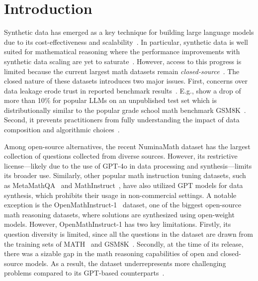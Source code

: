 

\section{Introduction}

Synthetic data has emerged as a key technique for building large language models due to its cost-effectiveness and scalability~\citep{dubey2024llama3herdmodels, nvidia2024nemotron4340btechnicalreport, deepseekai2024deepseekv2strongeconomicalefficient}. 
In particular, synthetic data is well suited for mathematical reasoning where the performance improvements with synthetic data scaling are yet to saturate~\citep{zeng2024skyworkmathdatascalinglaws, chan2024scalingsyntheticdatacreation, yang2024qwen25mathtechnicalreportmathematical}. 
However, access to this progress is limited because the current largest math datasets remain \emph{closed-source}~\citep{zeng2024skyworkmathdatascalinglaws, yang2024qwen25mathtechnicalreportmathematical}. 
The closed nature of these datasets introduces two major issues. First, concerns over data leakage erode trust in reported benchmark results~\citep{aiyappa-etal-2023-trust}. E.g., \citet{zhang2024carefulexaminationlargelanguage} show a drop of more than 10\% for popular LLMs on an unpublished test set which is distributionally similar to the popular grade school math benchmark GSM8K~\citep{cobbe2021gsm8k}. Second, it prevents practitioners from fully understanding the impact of data composition and algorithmic choices~\citep{azerbayev2024llemma, soldaini-etal-2024-dolma}. 



Among open-source alternatives, the recent NuminaMath dataset \citep{li2024numinamath} has the largest collection of questions collected from diverse sources. However, its restrictive license—likely due to the use of GPT-4o in data processing and synthesis—limits its broader use.
Similarly, other popular math instruction tuning datasets, such as MetaMathQA~\citep{yu2024metamath} and MathInstruct~\citep{yue2024mammoth}, have also utilized GPT models for data synthesis, which prohibits their usage in non-commercial settings.  
A notable exception is the OpenMathInstruct-1~\citep{toshniwal2024openmathinstruct} dataset, one of the biggest open-source math reasoning datasets, where solutions are synthesized using open-weight models. 
However, OpenMathInstruct-1 has two key limitations. Firstly, its question diversity is limited, since all the questions in the dataset are drawn from the training sets of MATH~\citep{hendrycks2021measuringmathematicalproblemsolving} and GSM8K~\citep{cobbe2021gsm8k}. 
Secondly, at the time of its release, there was a sizable gap in the math reasoning capabilities of open and closed-source models. As a result, the dataset underrepresents more challenging problems compared to its GPT-based counterparts~\citep{gou2024toratoolintegratedreasoningagent}. 


